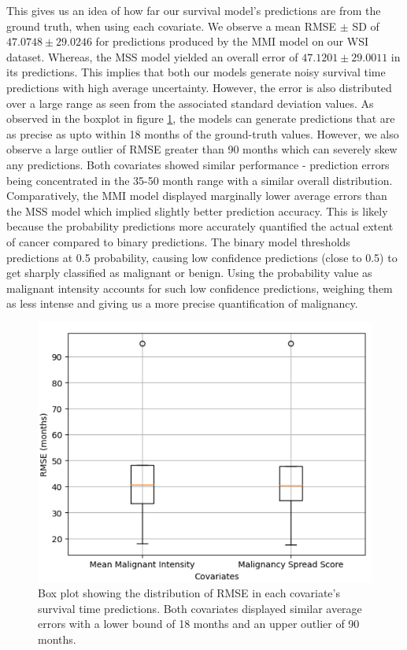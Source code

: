 \documentclass{l4proj}
\begin{document}
This gives us an idea of how far our survival model's predictions are from the ground truth, when using each covariate. We observe a mean RMSE \(\pm\) SD of \(47.0748 \pm 29.0246\) for predictions produced by the MMI model on our WSI dataset.  Whereas, the MSS model yielded an overall error of \(47.1201 \pm 29.0011\) in its predictions. This implies that both our models generate noisy survival time predictions with high average uncertainty. However, the error is also distributed over a large range as seen from the associated standard deviation values. As observed in the boxplot in figure \ref{fig:RMSE_box}, the models can generate predictions that are as precise as upto within 18 months of the ground-truth values. However, we also observe a large outlier of RMSE greater than 90 months which can severely skew any predictions. Both covariates showed similar performance - prediction errors being concentrated in the 35-50 month range with a similar overall distribution. Comparatively, the MMI model displayed marginally lower average errors than the MSS model which implied slightly better prediction accuracy. This is likely because the probability predictions more accurately quantified the actual extent of cancer compared to binary predictions. The binary model thresholds predictions at 0.5 probability, causing low confidence predictions (close to 0.5) to get sharply classified as malignant or benign. Using the probability value as malignant intensity accounts for such low confidence predictions, weighing them as less intense and giving us a more precise quantification of malignancy.

\begin{figure}[h]
    \centering
    \includegraphics[scale=0.3]{images/RMSE-boxplot.png}
    \caption{Box plot showing the distribution of RMSE in each covariate's survival time predictions. Both covariates displayed similar average errors with a lower bound of 18 months and an upper outlier of 90 months.}
    \label{fig:RMSE_box}
\end{figure}
\end{document}
